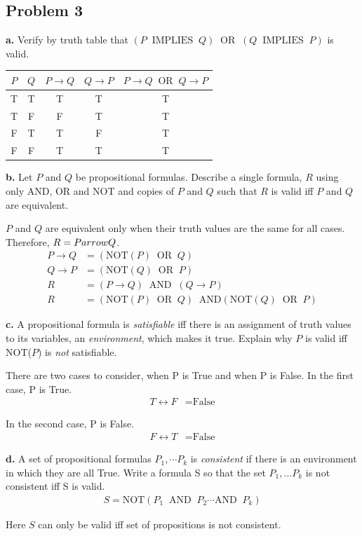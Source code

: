 \documentclass[12pt]{article}
\begin{document}
\subsection*{Problem 3}
\par{\textbf{a.} Verify by truth table that $(P\;\;\text{IMPLIES}\;\;Q)\;\;\text{OR}\;\;(Q\;\;\text{IMPLIES}\;\;P)$ is valid.}
\begin{center}
	\begin{tabular}{c|c|c|c|c}
	$P$ & $Q$ & $P \rightarrow Q$ & $Q \rightarrow P$ &$P \rightarrow Q\;\;\text{OR}\;\;Q \rightarrow P$ \\
	\hline
	T & T & T & T & T \\
	T & F & F & T & T \\
	F & T & T & F & T \\
	F & F & T & T & T \\
	\end{tabular}
\end{center}
\par{\textbf{b.} Let $P$ and $Q$ be propositional formulas. Describe a single formula, $R$ using only AND, OR and NOT and copies of $P$ and $Q$ such that $R$ is valid iff $P$ and $Q$ are equivalent.}
\newline
\par{$P$ and $Q$ are equivalent only when their truth values are the same for all cases. Therefore, $R = P \\arrow Q$.}
\begin{align*}
P \rightarrow Q &= (\text{NOT}(P)\;\;\text{OR}\;\;Q) \\
Q \rightarrow P &= (\text{NOT}(Q)\;\;\text{OR}\;\;P) \\
R &= (P \rightarrow Q)\;\;\text{AND}\;\;(Q \rightarrow P) \\
R &= (\text{NOT}(P)\;\;\text{OR}\;\;Q)\;\;\text{AND}(\text{NOT}(Q)\;\;\text{OR}\;\;P)
\end{align*}
\par{\textbf{c.} A propositional formula is \textit{satisfiable} iff there is an assignment of truth values to its variables, an \textit{environment}, which makes it true. Explain why $P$ is valid iff NOT($P$) is \textit{not} satisfiable.}
\newline
\par{There are two cases to consider, when P is True and when P is False. In the first case, P is True.}
\begin{align*}
T \leftrightarrow F &= \text{False}
\end{align*}
\par{In the second case, P is False.}
\begin{align*}
F \leftrightarrow T &= \text{False}
\end{align*}
\par{\textbf{d.} A set of propositional formulas $P_1, \cdots P_k$ is \textit{consistent} if there is an environment in which they are all True. Write a formula S so that the set $P_1, ... P_k$ is not consistent iff S is valid.}
\begin{align*}
S = \text{NOT}(P_1\;\;\text{AND}\;\;P_2\cdots\text{AND}\;\;P_k)
\end{align*}
\par{Here $S$ can only be valid iff set of propositions is not consistent.}
\end{document}
